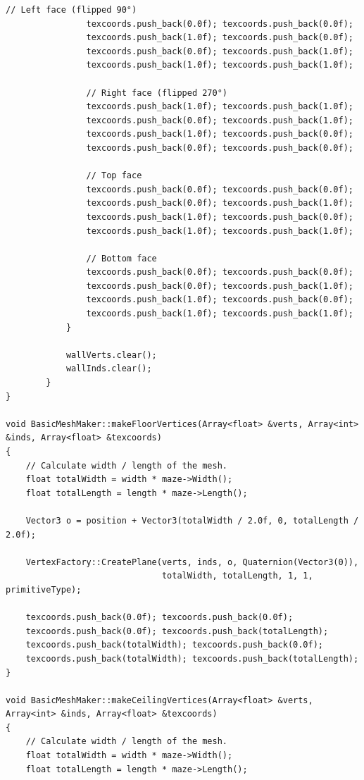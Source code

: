 \begin{lstlisting}[caption= The \texttt{BasicMeshMaker} class]
                // Left face (flipped 90°)
                texcoords.push_back(0.0f); texcoords.push_back(0.0f);
                texcoords.push_back(1.0f); texcoords.push_back(0.0f);
                texcoords.push_back(0.0f); texcoords.push_back(1.0f);
                texcoords.push_back(1.0f); texcoords.push_back(1.0f);
                
                // Right face (flipped 270°)
                texcoords.push_back(1.0f); texcoords.push_back(1.0f);
                texcoords.push_back(0.0f); texcoords.push_back(1.0f);
                texcoords.push_back(1.0f); texcoords.push_back(0.0f);
                texcoords.push_back(0.0f); texcoords.push_back(0.0f);
                
                // Top face
                texcoords.push_back(0.0f); texcoords.push_back(0.0f);
                texcoords.push_back(0.0f); texcoords.push_back(1.0f);
                texcoords.push_back(1.0f); texcoords.push_back(0.0f);
                texcoords.push_back(1.0f); texcoords.push_back(1.0f);
                
                // Bottom face
                texcoords.push_back(0.0f); texcoords.push_back(0.0f);
                texcoords.push_back(0.0f); texcoords.push_back(1.0f);
                texcoords.push_back(1.0f); texcoords.push_back(0.0f);
                texcoords.push_back(1.0f); texcoords.push_back(1.0f);
            }
            
            wallVerts.clear();
            wallInds.clear();
        }
}

void BasicMeshMaker::makeFloorVertices(Array<float> &verts, Array<int> &inds, Array<float> &texcoords)
{
    // Calculate width / length of the mesh.
    float totalWidth = width * maze->Width();
    float totalLength = length * maze->Length();
    
    Vector3 o = position + Vector3(totalWidth / 2.0f, 0, totalLength / 2.0f);
    
    VertexFactory::CreatePlane(verts, inds, o, Quaternion(Vector3(0)),
                               totalWidth, totalLength, 1, 1, primitiveType);
    
    texcoords.push_back(0.0f); texcoords.push_back(0.0f);
    texcoords.push_back(0.0f); texcoords.push_back(totalLength);
    texcoords.push_back(totalWidth); texcoords.push_back(0.0f);
    texcoords.push_back(totalWidth); texcoords.push_back(totalLength);
}

void BasicMeshMaker::makeCeilingVertices(Array<float> &verts, Array<int> &inds, Array<float> &texcoords)
{
    // Calculate width / length of the mesh.
    float totalWidth = width * maze->Width();
    float totalLength = length * maze->Length();
    

\end{lstlisting}

